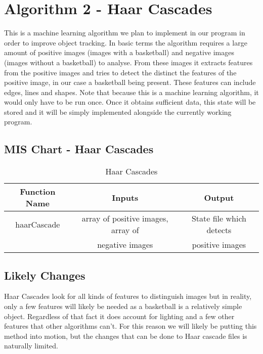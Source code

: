 \section{Algorithm 2 - Haar Cascades}
This is a machine learning algorithm we plan to implement in our program in order to improve object tracking. In basic terms the algorithm requires a large amount of positive images (images with a basketball) and negative images (images without a basketball) to analyse. From these images it extracts features from the positive images and tries to detect the distinct the features of the positive image, in our case a basketball being present. These features can include edges, lines and shapes. Note that because this is a machine learning algorithm, it would only have to be run once. Once it obtains sufficient data, this state will be stored and it will be simply implemented alongside the currently working program. 


\subsection{MIS Chart - Haar Cascades}
\begin{table}[h!]
  \centering
  \caption{Haar Cascades}
  \label{tab:table11}
  \begin{tabular}{ccc}
    \toprule
    Function Name & Inputs & Output\\
    \midrule
    haarCascade & array of positive images, array of & State file which detects\\
     & negative images & positive images\\
    \bottomrule
  \end{tabular}
\end{table}

\subsection{Likely Changes}
Haar Cascades look for all kinds of features to distinguish images but in reality, only a few features will likely be needed as a basketball is a relatively simple object. Regardless of that fact it does account for lighting and a few other features that other algorithms can't. For this reason we will likely be putting this method into motion, but the changes that can be done to Haar cascade files is naturally limited.

